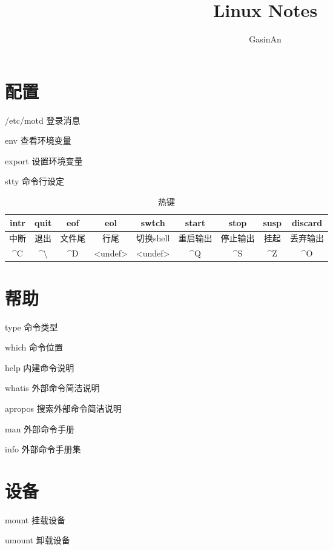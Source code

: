 \documentclass[12pt]{ctexart}
\title{Linux Notes}
\author{GasinAn}
\theoremstyle{definition}
\begin{document}
    \maketitle

    \tableofcontents

    \section{配置}

    /etc/motd 登录消息

    env 查看环境变量

    export 设置环境变量

    stty 命令行设定
    \begin{table}[htbp]
        \centering
        \begin{tabular}{|c|c|c|c|c|c|c|c|c|}
            \hline
            intr & quit & eof & eol & swtch & start & stop & susp & discard \\
            \hline
            中断 & 退出 & 文件尾 & 行尾 & 切换shell & 重启输出 & 停止输出 & 挂起 & 丢弃输出 \\
            \hline
            \^{}C & \^{}\textbackslash & \^{}D & <undef> & <undef> & \^{}Q & \^{}S & \^{}Z & \^{}O \\
            \hline
        \end{tabular}
        \caption{热键}
    \end{table}

    \section{帮助}

    type 命令类型

    which 命令位置

    help 内建命令说明

    whatis 外部命令简洁说明

    apropos 搜索外部命令简洁说明

    man 外部命令手册

    info 外部命令手册集

    \section{设备}

    mount 挂载设备

    umount 卸载设备
\end{document}

